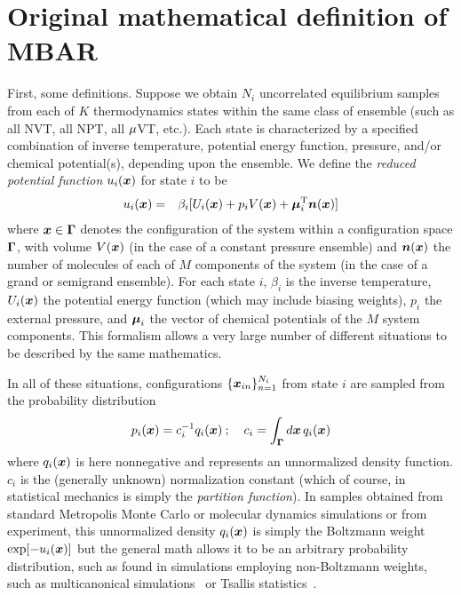\documentclass[aps,pre,twocolumn,superscriptaddress]{revtex4-1}
\newcommand{\bfv}[1]{{\mbox{\boldmath{$#1$}}}}
\newcommand{\bfm}[1]{{\bf #1}}
\newcommand{\x}{\bfv{x}}
\newcommand{\T}{\mathrm{T}}                                %
\begin{document}
\section{Original mathematical definition of MBAR}

First, some definitions. Suppose we obtain $N_i$ uncorrelated
equilibrium samples~\cite{MLEmeasure_foot2} from each of $K$
thermodynamics states within the same class of ensemble (such as all
NVT, all NPT, all $\bfm{\mu}$VT, etc.).  Each state is characterized
by a specified combination of inverse temperature, potential energy
function, pressure, and/or chemical potential(s), depending upon the
ensemble.  We define the \emph{reduced potential function} $u_i(\x)$
for state $i$ to be
\begin{eqnarray}
u_i(\x) &=& \beta_i [ U_i(\x) + p_i V(\x) + \bfv{\mu}_i^\T \bfv{n}(\x) ] \label{equation:reduced-potential}
\end{eqnarray}
where $\x \in \bfm{\Gamma}$ denotes the configuration of the system
within a configuration space $\bfm{\Gamma}$, with volume $V(\x)$ (in
the case of a constant pressure ensemble) and $\bfv{n}(\x)$ the number
of molecules of each of $M$ components of the system (in the case of a
grand or semigrand ensemble).  For each state $i$, $\beta_i$ is the
inverse temperature, $U_i(\x)$ the potential energy function (which
may include biasing weights), $p_i$ the external pressure, and
$\bfv{\mu}_i$ the vector of chemical potentials of the $M$ system
components.  This formalism allows a very large number of different
situations to be described by the same mathematics.

In all of these situations, configurations $\{\x_{in}\}_{n=1}^{N_i}$
from state $i$ are sampled from the probability distribution
\begin{eqnarray}
p_i(\x) = c_i^{-1} q_i(\x) \: &;& \: c_i = \int_{\bfm{\Gamma}} d\x \, q_i(\x)
\end{eqnarray}
where $q_i(\x)$ is here nonnegative and represents an unnormalized
density function. $c_i$ is the (generally unknown) normalization
constant (which of course, in statistical mechanics is simply the
\emph{partition function}). In samples obtained from standard
Metropolis Monte Carlo or molecular dynamics simulations or from
experiment, this unnormalized density $q_i(\x)$ is simply the
Boltzmann weight $\exp[-u_i(\x)]$ but the general math allows it to be
an arbitrary probability distribution, such as found in simulations
employing non-Boltzmann weights, such as multicanonical
simulations~\cite{mezei:j-comp-phys:1987:muca} or Tsallis
statistics~\cite{tsallis:j-stat-phys:1988:tsallis-statistics}.
\end{document}
